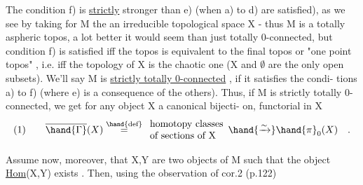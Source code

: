 The condition f)  is \uline{strictly} stronger than e) (when a) to d) are
satisfied),  as we see by taking for M the 
  an irreducible topological space X
-  thus M is a totally aspheric topos,  a lot better it would seem than
just totally 0-connected,  but condition f) is satisfied iff the topos is
equivalent to  the final topos or "one point topos" ,  i.e. iff the
topology of X is the chaotic one (X and $\emptyset$  are the only open subsets).
We'll say M is \uline{strictly totally 0-connected} ,  if it satisfies the condi-%
tions a) to f) (where e) is a consequence of the others).  Thus,  if M is
strictly totally 0-connected,  we get for any object X a canonical bijecti-%
on,  functorial in X
\[ (1) \qquad \overline{\hand{\Gamma}}(X) \overset{\hand{\text{def}}}{=} \begin{array}{l}\text{homotopy classes}\\ \text{of sections of X}\end{array} \hand{\xrightarrow{\sim}} \hand{\pi}_{0}(X) \quad . \]

Assume now,  moreover,  that X,Y are two objects of M such that
the object \uline{Hom}(X,Y)  exists . Then,  using the observation of cor.2 (p.122)
